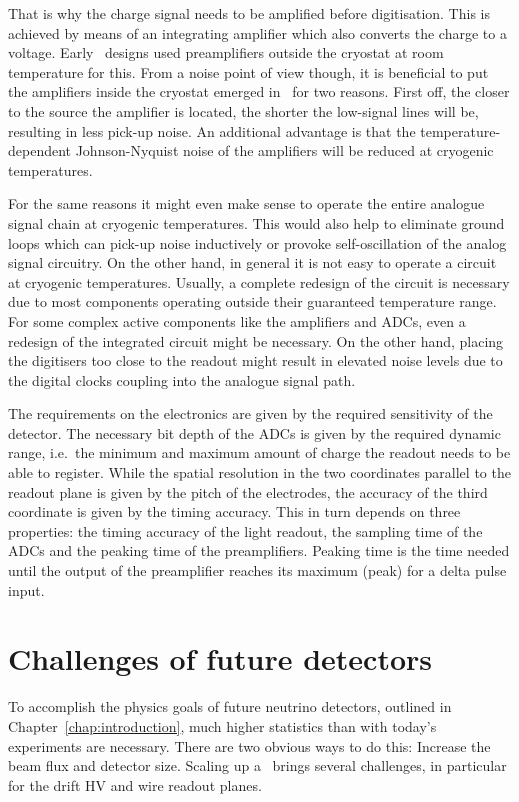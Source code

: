 That is why the charge signal needs to be amplified before digitisation.
This is achieved by means of an integrating amplifier which also converts the charge to a voltage.
Early \lartpc\ designs used preamplifiers outside the cryostat at room temperature for this.
From a noise point of view though, it is beneficial to put the amplifiers inside the cryostat emerged in \lar\ for two reasons.
First off, the closer to the source the amplifier is located, the shorter the low-signal lines will be, resulting in less pick-up noise.
An additional advantage is that the temperature-dependent Johnson-Nyquist noise of the amplifiers will be reduced at cryogenic temperatures.

For the same reasons it might even make sense to operate the entire analogue signal chain at cryogenic temperatures.
This would also help to eliminate ground loops which can pick-up noise inductively or provoke self-oscillation of the analog signal circuitry.
On the other hand, in general it is not easy to operate a circuit at cryogenic temperatures.
Usually, a complete redesign of the circuit is necessary due to most components operating outside their guaranteed temperature range.
For some complex active components like the amplifiers and ADCs, even a redesign of the integrated circuit might be necessary.
On the other hand, placing the digitisers too close to the readout might result in elevated noise levels due to the digital clocks coupling into the analogue signal path.

The requirements on the electronics are given by the required sensitivity of the detector.
The necessary bit depth of the ADCs is given by the required dynamic range, i.e.\ the minimum and maximum amount of charge the readout needs to be able to register.
While the spatial resolution in the two coordinates parallel to the readout plane is given by the pitch of the electrodes, the accuracy of the third coordinate is given by the timing accuracy.
This in turn depends on three properties: the timing accuracy of the light readout, the sampling time of the ADCs and the peaking time of the preamplifiers.
Peaking time is the time needed until the output of the preamplifier reaches its maximum (peak) for a delta pulse input.


\section{Challenges of future detectors\label{sec:lartpc_challenges}}
To accomplish the physics goals of future neutrino detectors, outlined in Chapter~\ref{chap:introduction}, much higher statistics than with today's experiments are necessary.
There are two obvious ways to do this: Increase the beam flux and detector size.
Scaling up a \lartpc\ brings several challenges, in particular for the drift HV and wire readout planes.

